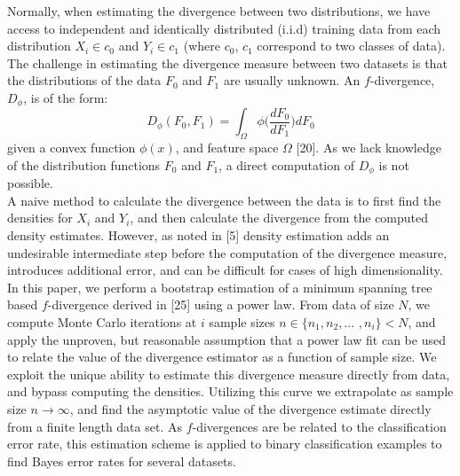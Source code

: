 \documentclass{article}
\begin{document}
	\indent Normally, when estimating the divergence between two distributions, we have access to independent and identically distributed (i.i.d) training data from each distribution $X_i \in c_0$ and $Y_i \in c_1$ (where $c_0$, $c_1$ correspond to two classes of data). The challenge in estimating the divergence measure between two datasets is that the distributions of the data $F_0$ and $F_1$ are usually unknown. An $f$-divergence, $D_\phi$, is of the form: \begin{equation} D_\phi(F_0, F_1) = \int_{\Omega} \phi\bigg(\frac{dF_0}{dF_1}\bigg)dF_0 \end{equation} given a convex function $\phi(x)$, and feature space $\Omega$ [20].
 	As we lack knowledge of the distribution functions $F_0$ and $F_1$, a direct computation of $D_\phi$ is not possible.
 	\\ [0.5ex]
 	
 	\indent A naive method to calculate the divergence between the data is to first find the densities for $X_i$ and $Y_i$, and then calculate the divergence from the computed density estimates. However, as noted in [5] density estimation adds an undesirable intermediate step before the computation of the divergence measure, introduces additional error, and can be difficult for cases of high dimensionality. 
	\\ [0.5ex]
	
	\indent	In this paper, we perform a bootstrap estimation of a minimum spanning tree based $f$-divergence derived in [25] using a power law. From data of size $N$, we compute  Monte Carlo iterations at $i$ sample sizes $n\in \{n_1, n_2,... $ $,n_i\}<N$, and apply the unproven, but reasonable assumption that a power law fit can be used to relate the value of the divergence estimator as a function of sample size. We exploit the unique ability to estimate this divergence measure directly from data, and bypass computing the densities. Utilizing this curve we extrapolate as sample size $n\rightarrow\infty$, and find the asymptotic value of the divergence estimate directly from a finite length data set.  As $f$-divergences are be related to the classification error rate, this estimation scheme is applied to binary classification examples to find Bayes error rates for several datasets.
 	\\ [0.5ex]
 	
\end{document}
